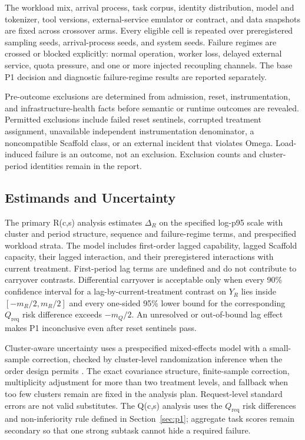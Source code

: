 The workload mix, arrival process, task corpus, identity distribution, model and tokenizer, tool versions, external-service emulator or contract, and data snapshots are fixed across crossover arms. Every eligible cell is repeated over preregistered sampling seeds, arrival-process seeds, and system seeds. Failure regimes are crossed or blocked explicitly: normal operation, worker loss, delayed external service, quota pressure, and one or more injected recoupling channels. The base P1 decision and diagnostic failure-regime results are reported separately.

Pre-outcome exclusions are determined from admission, reset, instrumentation, and infrastructure-health facts before semantic or runtime outcomes are revealed. Permitted exclusions include failed reset sentinels, corrupted treatment assignment, unavailable independent instrumentation denominator, a noncompatible Scaffold class, or an external incident that violates Omega. Load-induced failure is an outcome, not an exclusion. Exclusion counts and cluster-period identities remain in the report.

\subsection{Estimands and Uncertainty}

The primary R(c,s) analysis estimates $\Delta_R$ on the specified log-p95 scale with cluster and period structure, sequence and failure-regime terms, and prespecified workload strata. The model includes first-order lagged capability, lagged Scaffold capacity, their lagged interaction, and their preregistered interactions with current treatment. First-period lag terms are undefined and do not contribute to carryover contrasts. Differential carryover is acceptable only when every 90\% confidence interval for a lag-by-current-treatment contrast on $Y_R$ lies inside $[-m_R/2,m_R/2]$ and every one-sided 95\% lower bound for the corresponding $Q_{\mathrm{req}}$ risk difference exceeds $-m_Q/2$. An unresolved or out-of-bound lag effect makes P1 inconclusive even after reset sentinels pass.

Cluster-aware uncertainty uses a prespecified mixed-effects model with a small-sample correction, checked by cluster-level randomization inference when the order design permits \cite{turner2007cluster}. The exact covariance structure, finite-sample correction, multiplicity adjustment for more than two treatment levels, and fallback when too few clusters remain are fixed in the analysis plan. Request-level standard errors are not valid substitutes. The Q(c,s) analysis uses the $Q_{\mathrm{req}}$ risk differences and non-inferiority rule defined in Section~\ref{sec:p1}; aggregate task scores remain secondary so that one strong subtask cannot hide a required failure.

